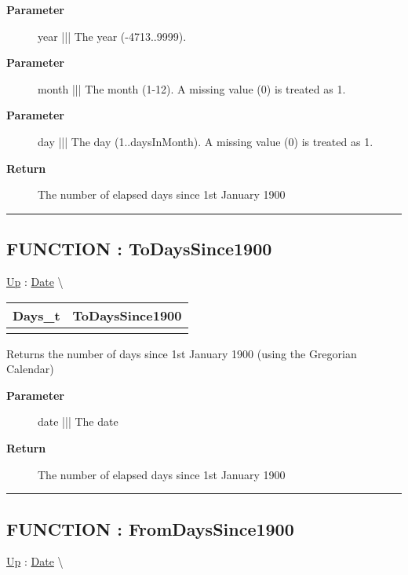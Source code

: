 \par
\begin{description}
\item [\textbf{Parameter}] year ||| The year (-4713..9999).
\item [\textbf{Parameter}] month ||| The month (1-12). A missing value (0) is treated as 1.
\item [\textbf{Parameter}] day ||| The day (1..daysInMonth). A missing value (0) is treated as 1.
\item [\textbf{Return}] The number of elapsed days since 1st January 1900
\end{description}

\rule{\linewidth}{0.5pt}
\subsection*{FUNCTION : ToDaysSince1900}
\hypertarget{ecldoc:date.todayssince1900}{}
\hyperlink{ecldoc:Date}{Up} :
\hspace{0pt} \hyperlink{ecldoc:Date}{Date} \textbackslash 

{\renewcommand{\arraystretch}{1.5}
\begin{tabularx}{\textwidth}{|>{\raggedright\arraybackslash}l|X|}
\hline
\hspace{0pt}Days\_t & ToDaysSince1900 \\
\hline
\multicolumn{2}{|>{\raggedright\arraybackslash}X|}{\hspace{0pt}(Date\_t date)} \\
\hline
\end{tabularx}
}

\par
Returns the number of days since 1st January 1900 (using the Gregorian Calendar)

\par
\begin{description}
\item [\textbf{Parameter}] date ||| The date
\item [\textbf{Return}] The number of elapsed days since 1st January 1900
\end{description}

\rule{\linewidth}{0.5pt}
\subsection*{FUNCTION : FromDaysSince1900}
\hypertarget{ecldoc:date.fromdayssince1900}{}
\hyperlink{ecldoc:Date}{Up} :
\hspace{0pt} \hyperlink{ecldoc:Date}{Date} \textbackslash 

